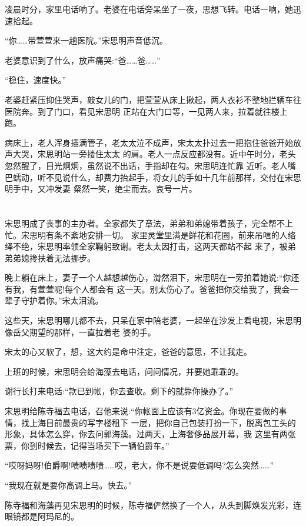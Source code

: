 \documentclass[11pt,a4paper,onecolumn]{article}
\begin{document}
凌晨时分，家里电话响了。老婆在电话旁呆坐了一夜，思想飞转。电话一响，她迅速拾起。

``你……带萱萱来一趟医院。''宋思明声音低沉。

老婆意识到了什么，放声痛哭:``爸……爸……''

``稳住，速度快。''

老婆赶紧压抑住哭声，敲女儿的门，把萱萱从床上揪起，两人衣衫不整地拦辆车往医院奔。到了门口，看见宋思明
正站在大门口等，一见两人来，拉着就往楼上跑。

病床上，老人浑身插满管子，老太太泣不成声，宋太太扑过去一把抱住爸爸开始放声大哭，宋思明站一旁搂住太太
的肩。老人一点反应都没有。近中午时分，老头忽然醒了，目光炯炯，虽然说不出话，手指却在勾。宋思明连忙靠
近听。老人嘴巴蠕动，听不见说什么，却费力抬起手，将女儿的手如十几年前那样，交付在宋思明手中，又冲发妻
粲然一笑，绝尘而去。哀号一片。

\section[\thesection]{}

宋思明成了丧事的主办者。全家都失了章法，弟弟和弟媳带着孩子，完全帮不上忙。宋思明有条不紊地安排一切。
家里灵堂里满是鲜花和花圈，前来吊唁的人络绎不绝，宋思明率领全家鞠躬致谢。老太太因打击，这两天都站不起
来了，被弟弟弟媳搀扶着无法挪步。

晚上躺在床上，妻子一个人越想越伤心，潸然泪下，宋思明在一旁拍着她说:``你还有我，有萱萱呢!每个人都会有
这一天。别太伤心了。爸爸把你交给我了，我会一辈子守护着你。''宋太泪流。

这些天，宋思明哪儿都不去，只呆在家中陪老婆，一起坐在沙发上看电视，宋思明像岳父期望的那样，一直拉着老
婆的手。

宋太的心又软了，想，这大约是命中注定，爸爸的意思，不让我走。

上班的时候，宋思明会给海藻去电话，问问情况，并要她乖乖的。

谢行长打来电话:``款已到帐，你去查收。剩下的就靠你操办了。''

宋思明给陈寺福去电话，召他来说:``你帐面上应该有3亿资金。你现在要做的事情，找上海目前最贵的写字楼租下
一层，把你自己包装打扮一下，脱离包工头的形象，具体怎么穿，你去问郭海藻。过两天，上海奢侈品展开幕，我
这里有两张票，你到时候去，记得当场买下一辆伯爵车。''

``哎呀妈呀!伯爵啊!啧啧啧啧……哎，老大，你不是说要低调吗?怎么突然……''

``我现在就是要你高调上马。快去。''

陈寺福和海藻再见宋思明的时候，陈寺福俨然换了一个人，从头到脚焕发光彩，连眼镜都是阿玛尼的。
\end{document}
